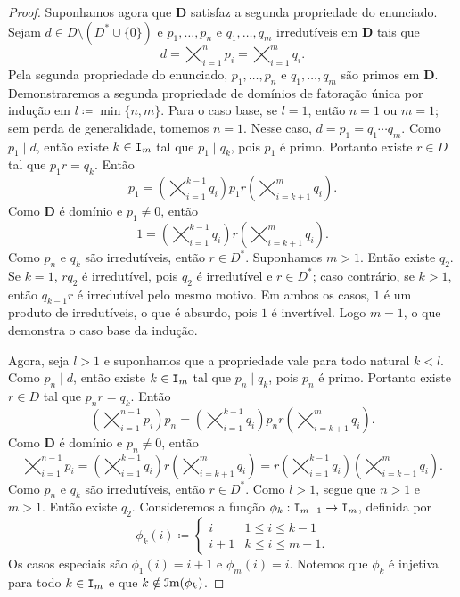 \begin{proof}
	Suponhamos agora que $\bm D$ satisfaz a segunda propriedade do enunciado. Sejam $d \in D \setminus (D^* \cup \{0\})$ e $p_1,\ldots,p_n$ e $q_1,\ldots,q_m$ irredutíveis em $\bm D$ tais que
	\begin{equation*}
	d = \bigtimes_{i=1}^n p_i = \bigtimes_{i=1}^m q_i.
	\end{equation*}
Pela segunda propriedade do enunciado, $p_1,\ldots,p_n$ e $q_1,\ldots,q_m$ são primos em $\bm D$. Demonstraremos a segunda propriedade de domínios de fatoração única por indução em $l \coloneqq \min\{n,m\}$. Para o caso base, se $l=1$, então $n=1$ ou $m=1$; sem perda de generalidade, tomemos $n=1$. Nesse caso, $d=p_1=q_1 \cdots q_m$. Como $p_1 \mid d$, então existe $k \in \mathtt I_m$ tal que $p_1 \mid q_k$, pois $p_1$ é primo. Portanto existe $r \in D$ tal que $p_1 r = q_k$. Então
	\begin{equation*}
	p_1 = \left(\bigtimes_{i=1}^{k-1} q_i\right) p_1 r \left(\bigtimes_{i=k+1}^m q_i\right).
	\end{equation*}
Como $\bm D$ é domínio e $p_1 \neq 0$, então
	\begin{equation*}
	1 = \left(\bigtimes_{i=1}^{k-1} q_i\right) r \left(\bigtimes_{i=k+1}^m q_i\right).
	\end{equation*}
Como $p_n$ e $q_k$ são irredutíveis, então $r \in D^*$. Suponhamos $m>1$. Então existe $q_2$. Se $k=1$, $r q_2$ é irredutível, pois $q_2$ é irredutível e $r \in D^*$; caso contrário, se $k>1$, então $q_{k-1}r$ é irredutível pelo mesmo motivo. Em ambos os casos, $1$ é um produto de irredutíveis, o que é absurdo, pois $1$ é invertível. Logo $m=1$, o que demonstra o caso base da indução.

	Agora, seja $l > 1$ e suponhamos que a propriedade vale para todo natural $k<l$. Como $p_n \mid d$, então existe $k \in \mathtt I_m$ tal que $p_n \mid q_k$, pois $p_n$ é primo. Portanto existe $r \in D$ tal que $p_n r = q_k$. Então
\begin{equation*}
	\left(\bigtimes_{i=1}^{n-1} p_i\right) p_n = \left(\bigtimes_{i=1}^{k-1} q_i\right) p_n r \left(\bigtimes_{i=k+1}^m q_i\right).
	\end{equation*}
Como $\bm D$ é domínio e $p_n \neq 0$, então
	\begin{equation*}
	\bigtimes_{i=1}^{n-1} p_i = \left(\bigtimes_{i=1}^{k-1} q_i\right) r \left(\bigtimes_{i=k+1}^m q_i\right) = r \left(\bigtimes_{i=1}^{k-1} q_i\right)\left(\bigtimes_{i=k+1}^m q_i\right).
	\end{equation*}
Como $p_n$ e $q_k$ são irredutíveis, então $r \in D^*$. Como $l > 1$, segue que $n > 1$ e $m > 1$. Então existe $q_2$. Consideremos a função $\phi_k : \mathtt I_{m-1} \to \mathtt I_m$, definida por
	\begin{equation*}
	\phi_k(i) \coloneqq
		\begin{cases}
		i & 1 \leq i \leq k-1 \\
		i+1 & k \leq i \leq m-1.
		\end{cases}
	\end{equation*}
Os casos especiais são $\phi_1(i)=i+1$ e $\phi_m(i)=i$. Notemos que $\phi_k$ é injetiva para todo $k \in \mathtt I_m$ e que $k \notin \mathcal{I}\mathrm{m}(\phi_k)$.


\end{proof}
